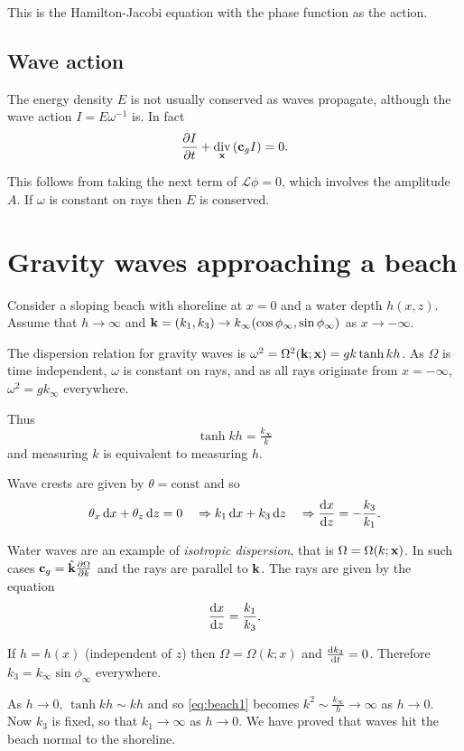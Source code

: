 \documentclass{notes}
\newcommand{\vk}{\vect{k}}
\newcommand{\cL}{\mathcal{L}}
\DeclareMathOperator{\dive}{div}
\begin{document}
This is the Hamilton-Jacobi equation with the phase function as the
action.

\subsection{Wave action}

The energy density $E$ is not usually conserved as waves propagate,
although the wave action $I = E \omega^{-1}$ is.  In fact
\[
\pddt{I} + \dive_\vx \left(\vect{c}_g I\right) = 0.
\]

This follows from taking the next term of $\cL \phi = 0$, which
involves the amplitude $A$.  If $\omega$ is constant on rays
then $E$ is conserved.

\section{Gravity waves approaching a beach}

\vspace{2in}

Consider a sloping beach with shoreline at $x=0$ and a water depth
$h(x,z)$.  Assume that $h \to \infty$ and
$\vk = (k_1,k_3) \to k_\infty (\cos \phi_\infty,\sin \phi_\infty)$ as
$x \to - \infty$.

The dispersion relation for gravity waves is
$\omega^2 = \Omega^2(\vk;\vx) = g k \tanh k h$.  As $\Omega$ is
time independent, $\omega$ is constant on rays, and as all
rays originate from $x = -\infty$, $\omega^2 = g k_\infty$ everywhere.

Thus
\begin{equation}\label{eq:beach1}
\tanh kh = \tfrac{k_\infty}{k}
\end{equation}
and measuring $k$ is equivalent to measuring $h$.

Wave crests are given by $\theta = \text{const}$ and so
\[
\theta_x\, \mathrm{d} x + \theta_z\,  \mathrm{d} z = 0 \quad \Rightarrow
k_1\, \mathrm{d} x + k_3\, \mathrm{d} z \quad \Rightarrow \frac{\mathrm{d} x}{\mathrm{d} z} = - \frac{k_3}{k_1}.
\] 

Water waves are an example of \emph{isotropic dispersion}, that is
$\Omega = \Omega(k;\mathbf{x})$.  In such cases $\vect{c}_g = \Hat{\vk}
\pd{\Omega}{k}$ and the rays are parallel to $\vk$.  The rays are given
by the equation
\[
\frac{\mathrm{d} x}{\mathrm{d} z} = \frac{k_1}{k_3}.
\]

If $h = h(x)$ (independent of $z$) then $\Omega = \Omega(k;x)$ and
$\frac{\mathrm{d} k_3}{\mathrm{d} t} = 0$.  Therefore $k_3 = k_\infty \sin \phi_\infty$
everywhere.

As $h \to 0$, $\tanh k h \sim k h$ and so \eqref{eq:beach1} becomes
$k^2 \sim \tfrac{k_\infty}{h} \to \infty$ as $h \to 0$.  Now $k_3$
is fixed, so that $k_1 \to \infty$ as $h \to 0$.  We have proved that
waves hit the beach normal to the shoreline.
\end{document}
